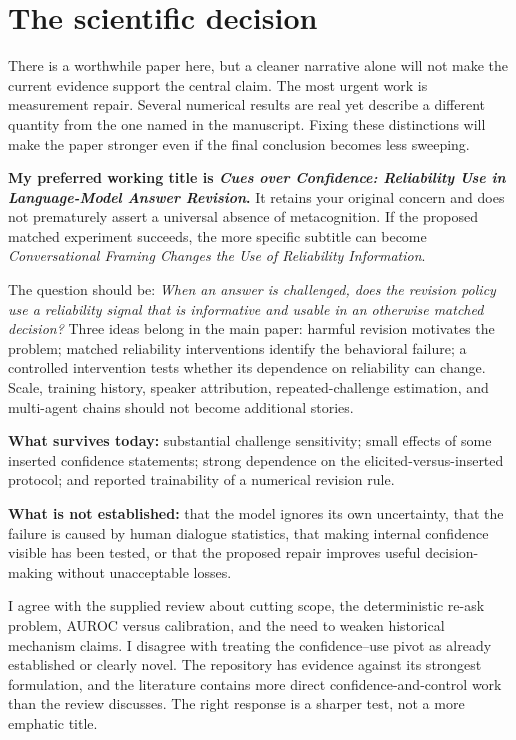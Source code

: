 \documentclass[11pt]{article}
\begin{document}
\setcounter{tocdepth}{1}
\tableofcontents
\clearpage

\section{The scientific decision}

There is a worthwhile paper here, but a cleaner narrative alone will not make the current evidence support the central claim. The most urgent work is measurement repair. Several numerical results are real yet describe a different quantity from the one named in the manuscript. Fixing these distinctions will make the paper stronger even if the final conclusion becomes less sweeping.

\textbf{My preferred working title is \emph{Cues over Confidence: Reliability Use in Language-Model Answer Revision}.} It retains your original concern and does not prematurely assert a universal absence of metacognition. If the proposed matched experiment succeeds, the more specific subtitle can become \emph{Conversational Framing Changes the Use of Reliability Information}.

The question should be: \emph{When an answer is challenged, does the revision policy use a reliability signal that is informative and usable in an otherwise matched decision?} Three ideas belong in the main paper: harmful revision motivates the problem; matched reliability interventions identify the behavioral failure; a controlled intervention tests whether its dependence on reliability can change. Scale, training history, speaker attribution, repeated-challenge estimation, and multi-agent chains should not become additional stories.

\begin{takeaway}
\textbf{What survives today:} substantial challenge sensitivity; small effects of some inserted confidence statements; strong dependence on the elicited-versus-inserted protocol; and reported trainability of a numerical revision rule.

\textbf{What is not established:} that the model ignores its own uncertainty, that the failure is caused by human dialogue statistics, that making internal confidence visible has been tested, or that the proposed repair improves useful decision-making without unacceptable losses.
\end{takeaway}

I agree with the supplied review about cutting scope, the deterministic re-ask problem, AUROC versus calibration, and the need to weaken historical mechanism claims. I disagree with treating the confidence--use pivot as already established or clearly novel. The repository has evidence against its strongest formulation, and the literature contains more direct confidence-and-control work than the review discusses. The right response is a sharper test, not a more emphatic title.
\end{document}
